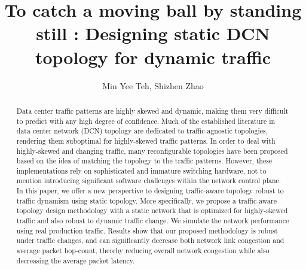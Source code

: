 \documentclass[sigconf]{acmart}
\theoremstyle{definition}
\begin{document}
\title[To catch a moving ball by standing still]{To catch a moving ball by standing still : Designing static DCN topology for dynamic traffic}


\author{Min Yee Teh, Shizhen Zhao}


\renewcommand{\shortauthors}{Teh .et al.}

\begin{abstract}
Data center traffic patterns are highly skewed and dynamic, making them very difficult to predict with any high degree of confidence. Much of the established literature in data center network (DCN) topology are dedicated to traffic-agnostic topologies, rendering them suboptimal for highly-skewed traffic patterns. In order to deal with highly-skewed and changing traffic, many reconfigurable topologies have been proposed based on the idea of matching the topology to the traffic patterns. However, these implementations rely on sophisticated and immature switching hardware, not to mention introducing significant software challenges within the network control plane. In this paper, we offer a new perspective to designing traffic-aware topology robust to traffic dynamism using static topology. More specifically, we propose a traffic-aware topology design methodology with a static network that is optimized for highly-skewed traffic and also robust to dynamic traffic change. We simulate the network performance using real production traffic. Results show that our proposed methodology is robust under traffic changes, and can significantly decrease both network link congestion and average packet hop-count, thereby reducing overall network congestion while also decreasing the average packet latency. 

\end{abstract}

\maketitle
\end{document}
